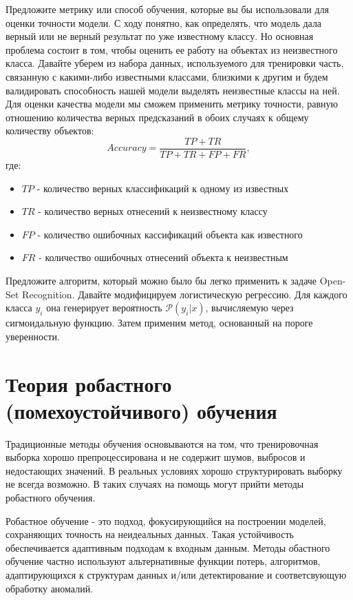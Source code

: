 \problem Предложите метрику или способ обучения, которые вы бы использовали для оценки точности модели.
\solution С ходу понятно, как определять, что модель дала верный или не верный результат по уже известному классу. 
Но основная проблема состоит в том, чтобы оценить ее работу на объектах из неизвестного класса.
Давайте уберем из набора данных, используемого для тренировки часть, связанную с какими-либо известными классами, близкими к другим и будем валидировать способность нашей модели выделять неизвестные классы на ней.
Для оценки качества модели мы сможем применить метрику точности, равную отношению количества верных предсказаний в обоих случаях к общему количеству объектов:
$$Accuracy = \frac{TP + TR}{TP + TR + FP + FR},$$
где:
\begin{itemize}
    \item $TP$ - количество верных классификаций к одному из известных
    \item $TR$ - количество верных отнесений к неизвестному классу
    \item $FP$ - количество ошибочных кассификаций объекта как известного
    \item $FR$ - количество ошибочных отнесений объекта к неизвестным
\end{itemize}

\problem Предложите алгоритм, который можно было бы легко применить к задаче Open-Set Recognition.
\solution Давайте модифицируем логистическую регрессию. Для каждого класса $y_i$ она генерирует вероятность $\mathcal{P}(y_i|x)$, вычисляемую через сигмоидальную функцию.
Затем применим метод, основанный на пороге уверенности.

\section{Теория робастного (помехоустойчивого) обучения}
Традиционные методы обучения основываются на
том, что тренировочная выборка хорошо препроцессирована и не содержит шумов,
выбросов и недостающих значений. В реальных условиях хорошо структурировать
выборку не всегда возможно. В таких случаях на помощь могут прийти методы
робастного обучения.

Робастное обучение - это подход, фокусирующийся на построении моделей,
сохраняющих точность на неидеальных данных. Такая устойчивость обеспечивается
адаптивным подходам к входным данным. Методы обастного обучение частно
используют альтернативные функции потерь, алгоритмов, адаптирующихся к
структурам данных и/или детектирование и соответсвующую обработку аномалий.


